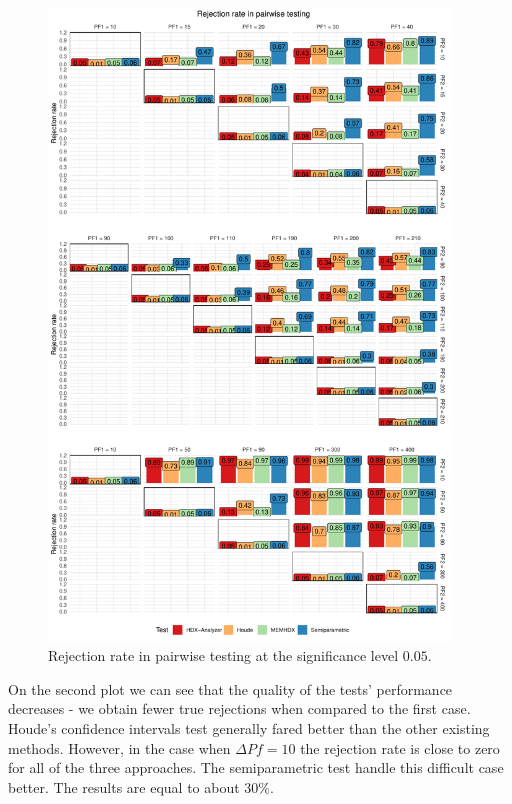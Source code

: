 \documentclass[]{MathAppl18}
\begin{document}
\begin{figure}[h!]
\label{results}
    \centering
    \includegraphics[width=0.95\textwidth]{Figures/results.pdf}
    \caption{Rejection rate in pairwise testing at the significance level $0.05$.}
\end{figure}


On the second plot we can see that the quality of the tests' performance decreases - we obtain fewer true rejections when compared to the first case. Houde's confidence intervals test generally fared better than the other existing methods. However, in the case when $\Delta Pf = 10$ the rejection rate is close to zero for all of the three approaches. The semiparametric test handle this difficult case better. The results are equal to about $30\%$.
\end{document}
